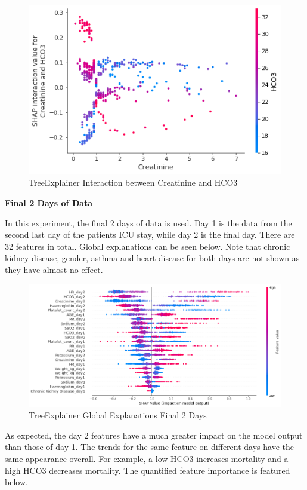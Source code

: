 \documentclass[12pt]{article}
\begin{document}
\begin{figure}[H]
\centering\caption{TreeExplainer Interaction between Creatinine and HCO3}
\includegraphics[scale=0.5]{TreeExplainer Final1 Global/TreeExplainer Final1 Interaction Creatinine HCO3.png}
\end{figure}

\textbf{Final 2 Days of Data}

In this experiment, the final 2 days of data is used. Day 1 is the data from the second last day of the patients ICU stay, while day 2 is the final day. There are 32 features in total. Global explanations can be seen below. Note that chronic kidney disease, gender, asthma and heart disease for both days are not shown as they have almost no effect.

\begin{figure}[H]
\centering\caption{TreeExplainer Global Explanations Final 2 Days}
\includegraphics[scale=0.4]{TreeExplainer Final2/TreeExplainer Final2 Global.png}
\end{figure}

As expected, the day 2 features have a much greater impact on the model output than those of day 1. The trends for the same feature on different days have the same appearance overall. For example, a low HCO3 increases mortality and a high HCO3 decreases mortality. The quantified feature importance is featured below.
\end{document}

